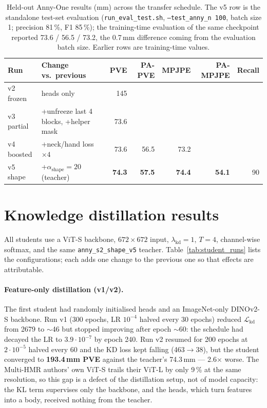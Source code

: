 \begin{table}[h]
\centering\small
\begin{tabular}{llrrrrr}
\toprule
Run & Change vs.\ previous & PVE & PA-PVE & MPJPE & PA-MPJPE & Recall \\
\midrule
v2 frozen   & heads only                          & 145 & \TODO{} & \TODO{} & \TODO{} & \TODO{} \\
v3 partial  & +unfreeze last 4 blocks, +helper mask & 73.6 & \TODO{} & \TODO{} & \TODO{} & \TODO{} \\
v4 boosted  & +neck/hand loss $\times4$            & 73.6 & 56.5 & 73.2 & \TODO{} & \TODO{} \\
v5 shape    & +$\alpha_{\text{shape}}{=}20$ (teacher) & \textbf{74.3} & \textbf{57.5} & \textbf{74.4} & \textbf{54.1} & 90 \\
\bottomrule
\end{tabular}
\caption{Held-out Anny-One results (mm) across the transfer schedule. The v5
row is the standalone test-set evaluation (\texttt{run\_eval\_test.sh},
\texttt{--test\_anny\_n 100}, batch size 1; precision 81\,\%, F1 85\,\%); the
training-time evaluation of the same checkpoint reported 73.6 / 56.5 / 73.2,
the 0.7\,mm difference coming from the evaluation batch size. Earlier rows
are training-time values. }
\label{tab:main}
\end{table}

\section{Knowledge distillation results}
\label{sec:kd_results}

All students use a ViT-S backbone, $672{\times}672$ input,
$\lambda_{\text{kd}}{=}1$, $T{=}4$, channel-wise softmax, and the same
\texttt{anny\_s2\_shape\_v5} teacher. Table~\ref{tab:student_runs} lists the
configurations; each adds one change to the previous one so that effects are
attributable.

\paragraph{Feature-only distillation (v1/v2).} The first student had randomly
initialised heads and an ImageNet-only DINOv2-S backbone. Run v1 (300 epochs,
LR $10^{-4}$ halved every 30 epochs) reduced $\mathcal{L}_{\text{kd}}$ from 2679
to $\sim$46 but stopped improving after epoch $\sim$60: the schedule had
decayed the LR to $3.9{\cdot}10^{-7}$ by epoch 240. Run v2 resumed for 200
epochs at $2{\cdot}10^{-5}$ halved every 60 and the KD loss kept falling
(463$\rightarrow$38), but the student converged to \textbf{193.4\,mm PVE}
against the teacher's 74.3\,mm --- 2.6$\times$ worse. The Multi-HMR authors'
own ViT-S trails their ViT-L by only 9\,\% at the same resolution, so this gap
is a defect of the distillation setup, not of model capacity: the KL term
supervises only the backbone, and the heads, which turn features into a body,
received nothing from the teacher.

